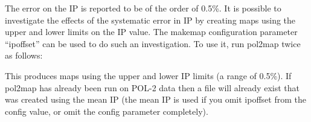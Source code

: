 The error on the IP is reported to be of the order of 0.5\%.
It is possible to investigate the effects of the systematic
error in IP by creating maps using the upper and lower limits on the
IP value. The makemap configuration parameter ``ipoffset'' can be
used to do such an investigation. To use it, run pol2map twice as follows:

\begin{terminalv}
\end{terminalv}

This produces maps using the upper and lower IP limits (a range of
0.5\%). If pol2map has already been run on POL-2 data then a file
will already exist that was created using the
mean IP (the mean IP is used if you omit ipoffset from the config
value, or omit the  config parameter completely).




